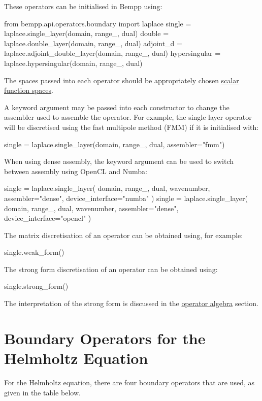 \documentclass[a4paper]{book}
\begin{document}
These operators can be initialised in Bempp using:
\begin{python}
from bempp.api.operators.boundary import laplace
single = laplace.single_layer(domain, range_, dual)
double = laplace.double_layer(domain, range_, dual)
adjoint_d = laplace.adjoint_double_layer(domain, range_, dual)
hypersingular = laplace.hypersingular(domain, range_, dual)
\end{python}
The spaces passed into each operator should be appropriately chosen
\href{scalar_function_spaces.md}{scalar function spaces}.

A keyword argument  may be passed into each constructor to change the assembler
used to assemble the operator. For example, the single layer operator will be discretised using
the fast multipole method (FMM) if it is initialised with:
\begin{python}
single = laplace.single_layer(domain, range_, dual, assembler="fmm")
\end{python}

When using dense assembly, the keyword argument  can be used to switch
between assembly using OpenCL and Numba:
\begin{python}
single = laplace.single_layer(
    domain, range_, dual, wavenumber, assembler="dense",
    device_interface="numba"
    )
single = laplace.single_layer(
    domain, range_, dual, wavenumber, assembler="dense",
    device_interface="opencl"
    )
\end{python}

The matrix discretisation of an operator can be obtained using, for example:

\begin{python}
single.weak_form()
\end{python}

The strong form discretisation of an operator can be obtained using:
\begin{python}
single.strong_form()
\end{python}
The interpretation of the strong form is discussed in the \href{operator_algebra.md}{operator algebra}
section.


\section{Boundary Operators for the Helmholtz Equation}

For the Helmholtz equation, there are four boundary operators that are used, as given in the table
below.
\end{document}
